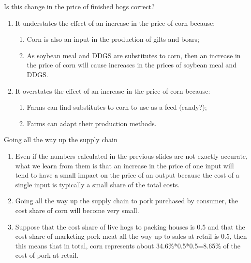 \documentclass[table,xcolor=pdftex,dvipsnames, handout]{beamer}\usepackage[]{graphicx}\usepackage[]{color}
\begin{document}
\begin{frame}{Is this change in the price of finished hogs correct?}
\begin{enumerate}[label=\textbullet]
  \item It understates the effect of an increase in the price of corn because:
    \begin{enumerate}[label=-]
        \item Corn is also an input in the production of gilts and boars;
        \item As soybean meal and DDGS are substitutes to corn, then an increase in the price of corn will cause increases in the prices of soybean meal and DDGS.
    \end{enumerate}
  \item It overstates the effect of an increase in the price of corn because:
    \begin{enumerate}[label=-]
        \item Farms can find substitutes to corn to use as a feed (candy?);
        \item Farms can adapt their production methods.
    \end{enumerate}
\end{enumerate}
\end{frame}


\begin{frame}{Going all the way up the supply chain}
\begin{enumerate}[label=\textbullet]
  \item Even if the numbers calculated in the previous slides are not exactly accurate, what we learn from them is that an increase in the price of one input will tend to have a small impact on the price of an output because the cost of a single input is typically a small share of the total costs.
  \item Going all the way up the supply chain to pork purchased by consumer, the cost share of corn will become very small.
  \item Suppose that the cost share of live hogs to packing houses is 0.5 and that the cost share of marketing pork meat all the way up to sales at retail is 0.5, then this means that in total, corn represents about 34.6\%*0.5*0.5=8.65\% of the cost of pork at retail.
\end{enumerate}
\end{frame}
\end{document}
